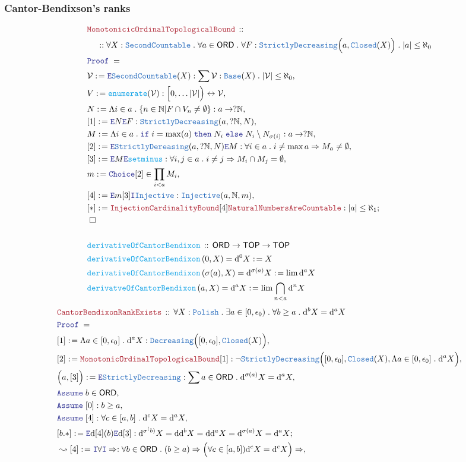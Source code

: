 \documentclass[12pt]{scrartcl}
\newcommand{\TYPE}[1]{\textcolor{NavyBlue}{\mathtt{#1}}}
\newcommand{\FUNC}[1]{\textcolor{Cerulean}{\mathtt{#1}}}
\newcommand{\LOGIC}[1]{\textcolor{Blue}{\mathtt{#1}}}
\newcommand{\THM}[1]{\textcolor{Maroon}{\mathtt{#1}}}
\renewcommand{\.}{\; . \;}
\newcommand{\de}{: \kern 0.1pc =}
\newcommand{\If}{\LOGIC{if} \;}
\newcommand{\Then}{ \; \LOGIC{then} \;}
\newcommand{\Else}{\; \LOGIC{else} \;}
\newcommand{\Act}[1]{\left( #1 \right)}
\newcommand{\Theorem}[2]{& \THM{#1} \, :: \, #2 \\ & \Proof = \\ }
\newcommand{\DeclareFunc}[2]{& \FUNC{#1} \, :: \, #2 \\}
\newcommand{\DefineNamedFunc}[4]{&  \FUNC{#1}\Act{#2} = #3 \de #4 \\}
\newcommand{\NewLine}{\\ & \kern 1pc}
\newcommand{\Page}[1]{ \begin{align*} #1 \end{align*}   }
\newcommand{\Imply}{\Rightarrow}
\newcommand{\Intro}{\LOGIC{I}}
\newcommand{\Elim}{\LOGIC{E}}
\newcommand{\Nat}{\mathbb{N} }
\newcommand{\ToBij}{\leftrightarrow}
\newcommand{\Say}[3]{& #1 \de #2 : #3, \\}
\newcommand{\SayIn}[3]{& #1 \de #2 \in #3, \\}
\newcommand{\Conclude}[3]{& #1 \de #2 : #3; \\}
\newcommand{\Derive}[3]{& \leadsto #1 \de #2 : #3, \\}
\newcommand{\Assume}[2]{& \LOGIC{Assume} \; #1 : #2, \\}
\newcommand{\AssumeIn}[2]{& \LOGIC{Assume} \; #1 \in #2, \\}
\newcommand{\QED}{\; \square}
\newcommand{\EndProof}{& \QED \\}
\newcommand{\Proof}{\LOGIC{Proof} \; }
\newcommand{\ORD}{\mathsf{ORD}}
\newcommand{\TOP}{\mathsf{TOP}}
\renewcommand{\d}{\mathrm{d}}
\newcommand{\Polish}{\TYPE{Polish}}
\begin{document}
\subsubsection{Cantor-Bendixson's ranks}
\Page{
	\Theorem{MonotonicicOrdinalTopologicalBound}
	{
		\NewLine ::
		\forall X : \TYPE{SecondCountable} \.
		\forall a \in \ORD \. 
		\forall F : \TYPE{StrictlyDecreasing}\Big(a, \TYPE{Closed}(X)\Big) \.
		|a| \le \aleph_0
	}
	\Say{\mathcal{V}}{\Elim \TYPE{SecondCountable}(X)}{\sum \mathcal{V} : \TYPE{Base}(X) \. |\mathcal{V}| \le \aleph_0}
	\Say{V}{\FUNC{enumerate}(\mathcal{V})}{\Big[0,\ldots |\mathcal{V}|\Big) \ToBij \mathcal{V} } 
	\Say{N}{\Lambda i \in a \. \{ n \in \Nat | F \cap V_n \neq \emptyset  \}}{a \to ?\Nat}
	\Say{[1]}{\Elim N \Elim F}{\TYPE{StrictlyDecreasing}(a,?\Nat,N)}
	\Say{M}{\Lambda i \in a \. \If i = \max(a) \Then N_i \Else N_i \setminus N_{\sigma(i)}}{a \to ?\Nat}
	\Say{[2]}{\Elim \TYPE{StrictlyDereasing}(a,?\Nat,N)\Elim M}{\forall i \in a \. i \neq \max a \Imply M_a \neq \emptyset}
	\Say{[3]}{\Elim M \Elim \FUNC{setminus}}{\forall i,j \in a \. i \neq j \Imply M_i \cap M_j = \emptyset}
	\SayIn{m}{\LOGIC{Choice}[2]}{\prod_{i < a} M_i}
	\Say{[4]}{\Elim m [3]\Intro \TYPE{Injective}}{\TYPE{Injective}(a,\Nat,m)}
	\Conclude{[*]}{\THM{InjectionCardinalityBound}[4]\THM{NaturalNumbersAreCountable}}{|a| \le \aleph_1}
	\EndProof
	\\
	\DeclareFunc{derivativeOfCantorBendixon}{\ORD \to \TOP \to \TOP}
	\DefineNamedFunc{derivativeOfCantorBendixon}{0,X}{\d^0 X}{X}
	\DefineNamedFunc{derivativeOfCantorBendixon}{\sigma(a),X}{\d^{\sigma(a)} X}{\lim \d^a X}
	\DefineNamedFunc{derivatveOfCantorBendixon}{a,X}{\d^a X}{ \lim \bigcap_{n < a} \d^n X  }
}\Page{
	\Theorem{CantorBendixonRankExists}
	{
		\forall X : \Polish \.
		\exists a \in [0,\epsilon_0) \. 
		\forall b \ge a \.
		\d^b X = \d^a X
	}
	\Say{[1]}{\Lambda a \in [0,\epsilon_0] \. \d^a X}{\TYPE{Decreasing}\Big( [0,\epsilon_0], \TYPE{Closed}(X)\Big)}
	\Say{[2]}{\THM{MonotonicOrdinalTopologicalBound}[1]}
	{
		\neg \TYPE{StrictlyDecreasing}\Big( 
			[0,\epsilon_0],
			\TYPE{Closed}(X), 
			\Lambda a \in [0,\epsilon_0] \.
				\d^a X
		\Big)
	}
	\Say{\Big(a,[3] \Big)}{\Elim \TYPE{StrictlyDecreasing}}{\sum a \in \ORD \. \d^{\sigma(a)} X = \d^a X}
	\AssumeIn{b}{\ORD}
	\Assume{[0]}{b \ge a}
	\Assume{[4]}{\forall c \in [a,b] \. \d^{c} X = \d^a X}
	\Conclude{[b.*]}{\Elim \d [4](b) \Elim \d [3]}
	{
		\d^{\sigma^(b)} X = \d \d^{b} X = \d \d^a X = \d^{\sigma(a)} X = \d^a X
	}
	\Derive{[4]}{\Intro \forall \Intro \Imply}
	{
		\forall b \in \ORD \. 
		(b \ge a) \Imply 
		\Big( \forall c \in [a,b]) \d^{c} X = \d^c X\Big) \Imply 
}}
\end{document}
